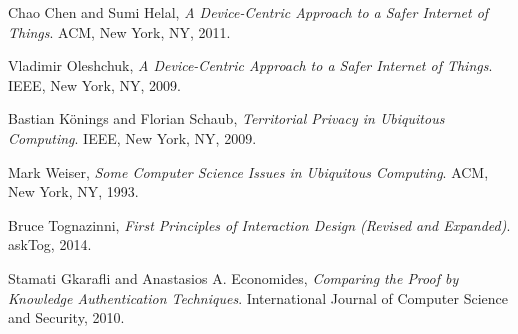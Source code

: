 \documentclass[11pt, oneside]{article}   	%
\begin{document}
\begin{thebibliography}{9}

  Chao Chen and Sumi Helal,
  \emph{A Device-Centric Approach to a Safer Internet of Things}.
  ACM, New York, NY,
  2011.
  
  Vladimir Oleshchuk,
  \emph{A Device-Centric Approach to a Safer Internet of Things}.
  IEEE, New York, NY,
  2009.
  
  Bastian K{\"o}nings and Florian Schaub,
  \emph{Territorial Privacy in Ubiquitous Computing}.
  IEEE, New York, NY,
  2009.
  
  Mark Weiser,
  \emph{Some Computer Science Issues in Ubiquitous Computing}.
  ACM, New York, NY,
  1993.
  
  Bruce Tognazinni,
  \emph{First Principles of Interaction Design (Revised and Expanded)}.
  askTog,
  2014.
  
  Stamati Gkarafli and Anastasios A. Economides,
  \emph{Comparing the Proof by Knowledge Authentication Techniques}.
  International Journal of Computer Science and Security,
  2010.



\end{thebibliography}
\end{document}
